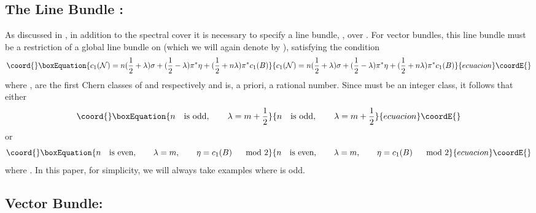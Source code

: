 \documentclass[a4paper,12pt]{article}
\numberwithin{equation}{section}
\def\cC{{\mathcal C}}
\def\cN{{\mathcal N}}
\theoremstyle{plain}
\begin{document}
\subsection*{The Line Bundle \myHighlight{$\cN$}\coordHE{}:}

As discussed in \cite{FMW, don2}, in addition to the spectral cover 
it is necessary to 
specify a line bundle, \myHighlight{$\cN$}\coordHE{}, over \myHighlight{$\cC$}\coordHE{}. For \coordHE{} vector bundles, this
line bundle must be a restriction of a global line bundle on \coordHE{}
(which we will again denote by \coordHE{}), satisfying the condition
\begin{equation}\coord{}\boxEquation{
c_{1}(\cN)=n(\frac{1}{2}+\lambda)\sigma+(\frac{1}{2}-\lambda)
\pi^{*}\eta+(\frac{1}{2}+n\lambda)\pi^{*}c_{1}(B)
\label{eq:27}
}{
c_{1}(\cN)=n(\frac{1}{2}+\lambda)\sigma+(\frac{1}{2}-\lambda)
\pi^{*}\eta+(\frac{1}{2}+n\lambda)\pi^{*}c_{1}(B)
}{ecuacion}\coordE{}\end{equation}
where \myHighlight{$c_{1}(\cN)$}\coordHE{}, \coordHE{} are the first Chern classes of \myHighlight{$\cN$}\coordHE{} and \coordHE{}
respectively and \myHighlight{$\lambda$}\coordHE{} is, a priori, a rational number. Since \myHighlight{$c_{1}(\cN)$}\coordHE{}
must be an integer class, it follows that either
\begin{equation}\coord{}\boxEquation{
n \quad \mbox{is odd}, \qquad \lambda=m+\frac{1}{2}
\label{eq:28}
}{
n \quad \mbox{is odd}, \qquad \lambda=m+\frac{1}{2}
}{ecuacion}\coordE{}\end{equation}
or
\begin{equation}\coord{}\boxEquation{
n \quad \mbox{is even}, \qquad \lambda=m, \qquad \eta=c_{1}(B) \quad \mod 2
\label{eq:29}
}{
n \quad \mbox{is even}, \qquad \lambda=m, \qquad \eta=c_{1}(B) \quad \mod 2
}{ecuacion}\coordE{}\end{equation}
where \coordHE{}. In this paper, for simplicity, we will always
take examples where \coordHE{} is odd.

\subsection*{\coordHE{} Vector Bundle:}
\end{document}

